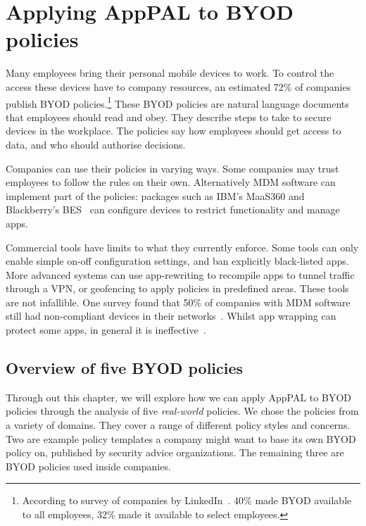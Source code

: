 \documentclass[thesis.tex]{subfiles}
\begin{document}
\chapter{Applying AppPAL to BYOD policies}
\label{chap:byod}

Many employees bring their personal mobile devices to work. To control
the access these devices have to company resources, an estimated 72\%
of companies publish \ac{BYOD} policies.\footnote{According to survey
  of companies by LinkedIn~\cite{schulze_byod_2016}. 40\% made \ac{BYOD}
  available to all employees, 32\% made it available to select
  employees.} These \ac{BYOD} policies are natural language documents
that employees should read and obey. They describe steps to take to
secure devices in the workplace. The policies say how employees should
get access to data, and who should authorise decisions.

Companies can use their policies in varying ways. Some companies may
trust employees to follow the rules on their own. Alternatively
\ac{MDM} software can implement part of the policies: packages such as
IBM's MaaS360 and Blackberry's BES~\cite{_ibm_????,_secure_????} can
configure devices to restrict functionality and manage apps.

Commercial tools have limits to what they currently enforce. Some
tools can only enable simple on-off configuration settings, and ban
explicitly black-listed apps. More advanced systems can use
app-rewriting to recompile apps to tunnel traffic through a VPN, or
geofencing to apply policies in predefined areas. These tools are not
infallible. One survey found that 50\% of companies with \ac{MDM}
software still had non-compliant devices in their
networks~\cite{mobileiron_security_labs_q4_2015}. Whilst app wrapping
can protect some apps, in general it is
ineffective~\cite{hao_effectiveness_2013}.

\section{Overview of five BYOD policies}
\label{sec:overview-of-five-byod-policies}

Through out this chapter, we will explore how we can apply AppPAL to
BYOD policies through the analysis of five \emph{real-world} policies.
We chose the policies from a variety of domains.  They cover a range
of different policy styles and concerns.  Two are example policy
templates a company might want to base its own BYOD policy on,
published by security advice organizations.  The remaining three are
BYOD policies used inside companies.
\end{document}
